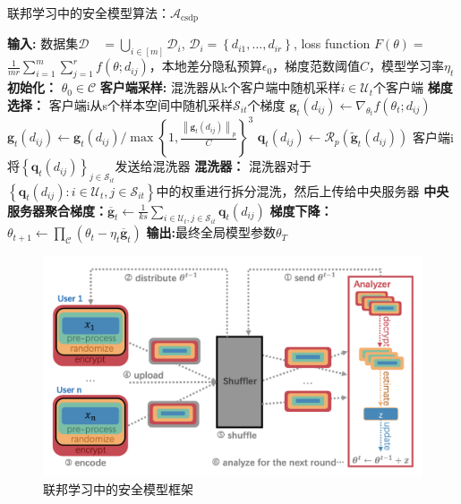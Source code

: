 \begin{algorithm}[!htb]
	\caption{联邦学习中的安全模型算法：$\mathcal{A}_{\text {csdp}}$}
	\label{联邦学习中的安全模型算法}
	\begin{algorithmic}[1]
		\footnotesize
		\STATE \textbf{输入:} 数据集$\mathcal{D} \quad=\bigcup_{i \in[m]} \mathcal{D}_{i}$, $\mathcal{D}_{i}=\left\{d_{i 1}, \ldots, d_{i r}\right\}$, loss function $F(\theta)=$ $\frac{1}{m r} \sum_{i=1}^{m} \sum_{j=1}^{r} f\left(\theta ; d_{i j}\right)$，本地差分隐私预算$\epsilon_{0}$，梯度范数阈值$C$，模型学习率$\eta_{t}$
		\STATE \textbf{初始化：} $\theta_{0} \in \mathcal{C}$
			\STATE \textbf{客户端采样:} 混洗器从k个客户端中随机采样$i \in \mathcal{U}_{t}$个客户端
				\STATE \textbf{梯度选择：} 客户端i从s个样本空间中随机采样$\mathcal{S}_{i t}$个梯度
					\STATE $\mathbf{g}_{t}\left(d_{i j}\right) \leftarrow \nabla_{\theta_{t}} f\left(\theta_{t} ; d_{i j}\right)$
					\STATE ${\mathbf{g}}_{t}\left(d_{i j}\right) \leftarrow \mathbf{g}_{t}\left(d_{i j}\right) / \max \left\{1, \frac{\left\|\mathbf{g}_{t}\left(d_{i j}\right)\right\|_{p}}{C}\right\}^{3}$
					\STATE $\mathbf{q}_{t}\left(d_{i j}\right) \leftarrow \mathcal{R}_{p}\left(\tilde{\mathbf{g}}_{t}\left(d_{i j}\right)\right)$
				\ENDFOR
				\STATE 客户端i将$\left\{\mathbf{q}_{t}\left(d_{i j}\right)\right\}_{j \in \mathcal{S}_{i t}}$发送给混洗器
			\ENDFOR
			\STATE \textbf{混洗器：} 混洗器对于$\left\{\boldsymbol{q}_{t}\left(d_{i j}\right): i \in \mathcal{U}_{t}, j \in \mathcal{S}_{i t}\right\}$中的权重进行拆分混洗，然后上传给中央服务器
			\STATE \textbf{中央服务器聚合梯度：}$\overline{\mathbf{g}}_{t} \leftarrow \frac{1}{k s} \sum_{i \in \mathcal{U}_{t}, j \in \mathcal{S}_{i t}} \boldsymbol{q}_{t}\left(d_{i j}\right)$
			\STATE \textbf{梯度下降：}$\theta_{t+1} \leftarrow \prod_{\mathcal{C}}\left(\theta_{t}-\eta_{t} \overline{\mathbf{g}}_{t}\right)$
		\ENDFOR
		\STATE \textbf{输出:}最终全局模型参数$\theta_{T}$

	\end{algorithmic}
\end{algorithm}

\begin{figure}[!hbt]
\centering
	\includegraphics[scale=0.5]{fig2/C4/shuffle模型}%
	\caption{联邦学习中的安全模型框架}
	\label{fig:联邦学习中的安全模型框架}	
\end{figure}

